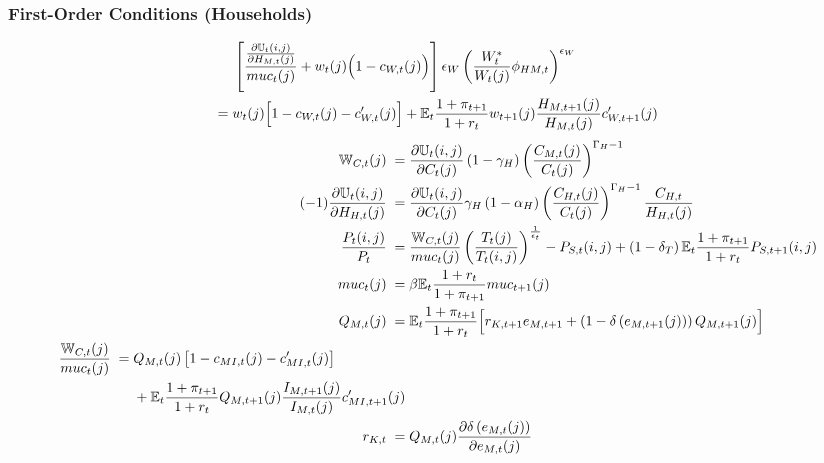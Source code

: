 \documentclass[12pt,3p,authoryear,review]{elsarticle}
\begin{document}
\subsubsection{First-Order Conditions (Households)}%
\vspace{-0.2in}%
\begin{small}%
	\begin{align}%
		\begin{split}%
			& \; \left[\frac{\frac{\partial \mathbb{U}_t(i,j)}{\partial H_{M,t}(j)}}{muc_t(j)} + w_t(j) \Bigl(1-c_{W,t}(j)\Bigr)\right] \epsilon_W \left(\frac{W_t^*}{W_t(j)}\phi_{HM,t}\right)^{\epsilon_W}\\%
			= & \; w_t(j) \Bigl[ 1-c_{W,t}(j)-c^{\prime}_{W,t}(j) \Bigr] + \mathbb{E}_t \frac{1+\pi_{t+1}}{1+r_t} w_{t+1}(j) \frac{H_{M,t+1}(j)}{H_{M,t}(j)} c^{\prime}_{W,t+1}(j)%
		\end{split}%
	\end{align}%
	\vspace{-0.4in}%
	\begin{align}%
		\mathbb{W}_{C,t}(j) \; = & \; \frac{\partial \mathbb{U}_t(i,j)}{\partial C_t(j)} \left(1-\gamma_H\right) \left(\frac{C_{M,t}(j)}{C_t(j)}\right)^{\Gamma_H-1}\\%
		(-1) \frac{\partial \mathbb{U}_t(i,j)}{\partial H_{H,t}(j)} \; = & \; \frac{\partial \mathbb{U}_t(i,j)}{\partial C_t(j)} \gamma_H \left(1-\alpha_H\right) \left(\frac{C_{H,t}(j)}{C_t(j)}\right)^{\Gamma_H-1} \frac{C_{H,t}}{H_{H,t}(j)}\\%
		\frac{P_t(i,j)}{P_t} \; = & \; \frac{\mathbb{W}_{C,t}(j)}{muc_t(j)} \left(\frac{T_t(j)}{T_t(i,j)}\right)^{\frac{1}{\epsilon_t}} - P_{S,t}(i,j) + \left(1-\delta_T\right) \mathbb{E}_t \frac{1+\pi_{t+1}}{1+r_t} P_{S,t+1}(i,j)\label{appendix:eq_demand}\\%
		muc_t(j) \; = & \; \beta \mathbb{E}_t \frac{1+r_t}{1+\pi_{t+1}} muc_{t+1}(j)\\%
		Q_{M,t}(j) \; = & \; \mathbb{E}_t \frac{1+\pi_{t+1}}{1+r_t} \Bigl[ r_{K,t+1} e_{M,t+1} + \left(1-\delta\left(e_{M,t+1}(j)\right)\right) Q_{M,t+1}(j) \Bigr]\\%
		\begin{split}%
			\frac{\mathbb{W}_{C,t}(j)}{muc_t(j)} \; = & \; Q_{M,t}(j) \left[ 1- c_{MI,t}(j) - c^{\prime}_{MI,t}(j) \right]\\%
			& \;+ \mathbb{E}_t \frac{1+\pi_{t+1}}{1+r_t} Q_{M,t+1}(j) \frac{I_{M,t+1}(j)}{I_{M,t}(j)} c^{\prime}_{MI,t+1}(j)%
		\end{split}\\%
		r_{K,t} \; = & \; Q_{M,t}(j) \frac{\partial \delta \left(e_{M,t}(j)\right)}{\partial e_{M,t}(j)}\\%

\end{align}
\end{small}
\end{document}
